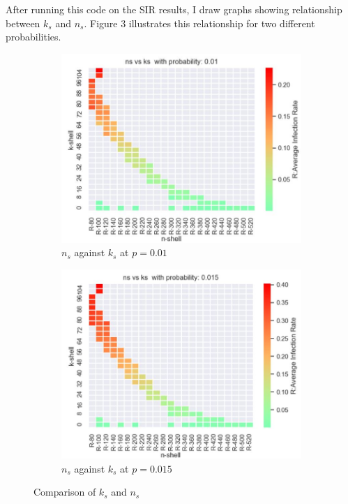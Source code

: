 \documentclass[11pt,a4,twocolumn]{article}
\begin{document}
After running this code on the SIR results,  I draw graphs showing relationship between  $k_{s}$ and $n_{s}$. Figure 3 illustrates this relationship for two different probabilities. 

\begin{figure}[h]
\begin{subfigure}{.5\textwidth}
	\centerline{\includegraphics[scale=.5]{ns-ks-01.jpg}}
	\caption{$n_{s}$ against $k_{s}$ at $p=0.01$}
	\label{fig:fig1}
\end{subfigure}
\begin{subfigure}{.5\textwidth}
	\centerline{\includegraphics[scale=.5]{ns-ks-015.jpg}}
	\caption{$n_{s}$ against $k_{s}$ at $p=0.015$}
	\label{fig:fig2}
\end{subfigure}
\caption{Comparison of $k_{s}$ and $n_{s}$}
\label{fig:fig}
\end{figure}
\end{document}
